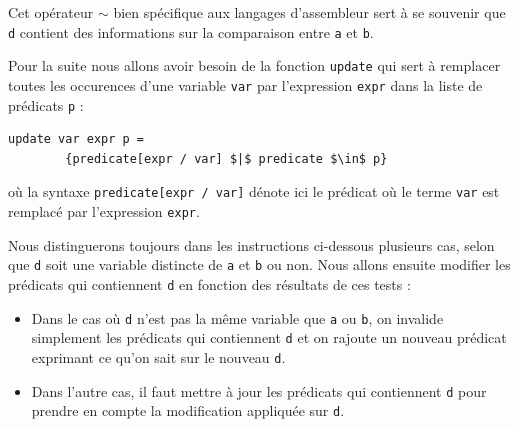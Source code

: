\documentclass[french]{article}
\begin{document}
    Cet opérateur $\sim$ bien spécifique aux langages d'assembleur sert à se souvenir que
    \texttt{d} contient des informations sur la comparaison entre \texttt{a} et \texttt{b}.

    Pour la suite nous allons avoir besoin de la fonction \texttt{update} qui sert à remplacer
    toutes les occurences d'une variable \texttt{var} par l'expression \texttt{expr} dans la liste de prédicats \texttt{p} :

  \begin{lstlisting}[mathescape]
    update var expr p =
        {predicate[expr / var] $|$ predicate $\in$ p}
  \end{lstlisting}

  où la syntaxe \texttt{predicate[expr / var]} dénote ici le prédicat où le terme \texttt{var} est remplacé par l'expression \texttt{expr}.

  \medbreak

  Nous distinguerons toujours dans les instructions ci-dessous plusieurs cas, selon que \texttt{d} soit une variable distincte de \texttt{a} et \texttt{b} ou non. Nous allons ensuite modifier les prédicats qui contiennent \texttt{d} en fonction des résultats de ces tests :
  \begin{itemize}
  \item Dans le cas où \texttt{d} n'est pas la même variable que \texttt{a} ou \texttt{b}, on invalide simplement les prédicats qui contiennent \texttt{d} et on rajoute un nouveau prédicat exprimant ce qu'on sait sur le nouveau \texttt{d}.
  \item Dans l'autre cas, il faut mettre à jour les prédicats qui contiennent \texttt{d} pour prendre en compte la modification appliquée sur \texttt{d}.
\end{itemize}
\end{document}
